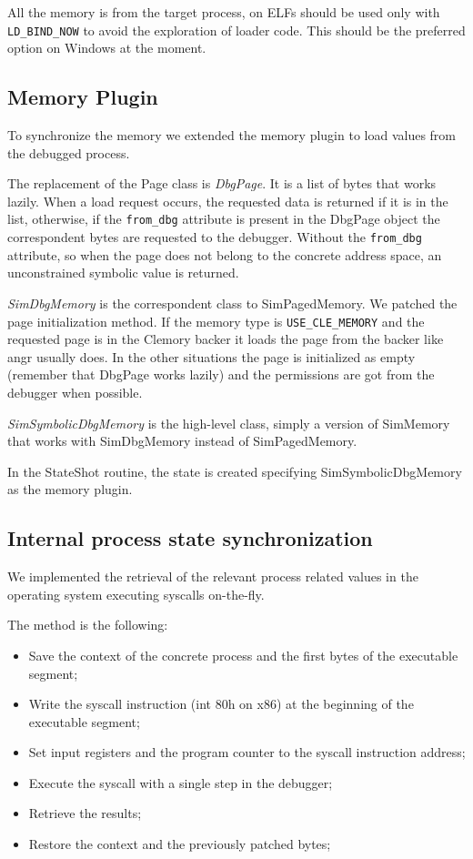 All the memory is from the target process, on ELFs should be used only with \verb|LD_BIND_NOW| to avoid the exploration of loader code. This should be the preferred option on Windows at the moment.

\subsection{Memory Plugin}

To synchronize the memory we extended the memory plugin to load values from the debugged process.

The replacement of the Page class is {\em DbgPage}. It is a list of bytes that works lazily. When a load request occurs, the requested data is returned if it is in the list, otherwise, if the \verb|from_dbg| attribute is present in the DbgPage object the correspondent bytes are requested to the debugger. Without the \verb|from_dbg| attribute, so when the page does not belong to the concrete address space, an unconstrained symbolic value is returned.

{\em SimDbgMemory} is the correspondent class to SimPagedMemory. We patched the page initialization method. If the memory type is \verb|USE_CLE_MEMORY| and the requested page is in the Clemory backer it loads the page from the backer like angr usually does. In the other situations the page is initialized as empty (remember that DbgPage works lazily) and the permissions are got from the debugger when possible.

{\em SimSymbolicDbgMemory} is the high-level class, simply a version of SimMemory that works with SimDbgMemory instead of SimPagedMemory.

In the StateShot routine, the state is created specifying SimSymbolicDbgMemory as the memory plugin.

\subsection{Internal process state synchronization}

We implemented the retrieval of the relevant process related values in the operating system executing syscalls on-the-fly.

The method is the following:

\begin{itemize}
\item Save the context of the concrete process and the first bytes of the executable segment;
\item Write the syscall instruction (int 80h on x86) at the beginning of the executable segment;
\item Set input registers and the program counter to the syscall instruction address;
\item Execute the syscall with a single step in the debugger;
\item Retrieve the results;
\item Restore the context and the previously patched bytes;
\end{itemize}


